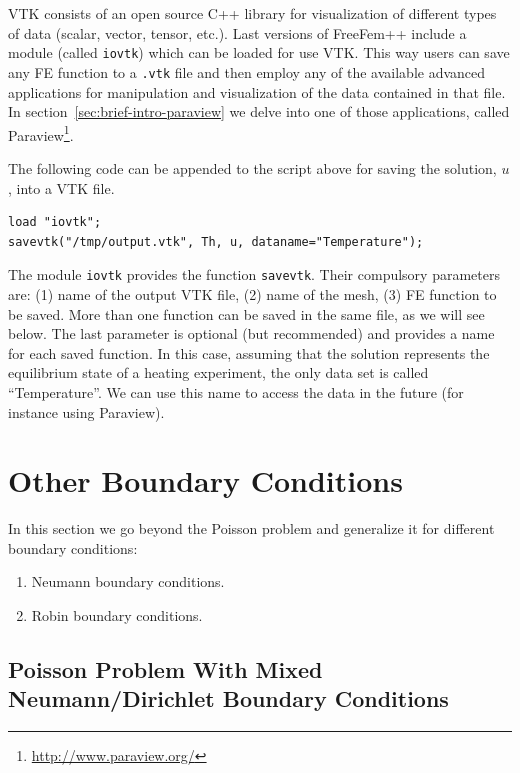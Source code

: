 \documentclass[12pt]{article}
\begin{document}
VTK consists of an open source C++ library for visualization of
different types of data (scalar, vector, tensor, etc.). Last versions
of FreeFem++ include a module (called \texttt{iovtk}) which can be
loaded for use VTK. This way users can save any FE function to a
\texttt{.vtk} file and then employ any of the available advanced
applications for manipulation and visualization of the data contained
in that file. In section~\ref{sec:brief-intro-paraview} we delve into
one of those applications, called
Paraview\footnote{\url{http://www.paraview.org/}}.

The following code can be appended to the script above for saving the
solution, $u$, into a VTK file.

\begin{lstlisting}
load "iovtk";
savevtk("/tmp/output.vtk", Th, u, dataname="Temperature");
\end{lstlisting}

The module \texttt{iovtk} provides the function
\texttt{savevtk}. Their compulsory parameters are: (1) name of the
output VTK file, (2) name of the mesh, (3) FE function to be
saved. More than one function can be saved in the same file, as we
will see below. The last parameter is optional (but recommended) and
provides a name for each saved function. In this case, assuming that
the solution represents the equilibrium state of a heating experiment,
the only data set is called ``Temperature''. We can use this name to
access the data in the future (for instance using Paraview).


\section{Other Boundary Conditions}
\label{sec:complex-problems}

In this section we go beyond the Poisson problem and generalize it for different boundary conditions:
\begin{enumerate}
\item Neumann boundary conditions.
\item Robin boundary conditions.
\end{enumerate}

\subsection{Poisson Problem With Mixed Neumann/Dirichlet Boundary Conditions}
\label{sec:poisson-problem-with-mixed-bc}
\end{document}
